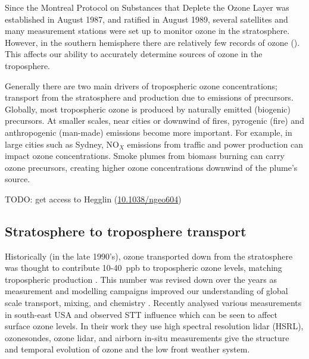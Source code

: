   
  
  Since the Montreal Protocol on Substances that Deplete the Ozone Layer was established in August 1987, and ratified in August 1989, several satellites and many measurement stations were set up to monitor ozone in the stratosphere.
  However, in the southern hemisphere there are relatively few records of ozone (\cite{Huang2017}).
  This affects our ability to accurately determine sources of ozone in the troposphere.
  
  Generally there are two main drivers of tropospheric ozone concentrations; transport from the stratosphere and production due to emissions of precursors. 
  Globally, most tropospheric ozone is produced by naturally emitted (biogenic) precursors.
  At smaller scales, near cities or downwind of fires, pyrogenic (fire) and anthropogenic (man-made) emissions become more important.
  For example, in large cities such as Sydney, NO$_X$ emissions from traffic and power production can impact ozone concentrations.
  Smoke plumes from biomass burning can carry ozone precursors, creating higher ozone concentrations downwind of the plume's source.
  
  
  TODO: get access to Hegglin (\url{10.1038/ngeo604}) \citep{Hegglin2009}
  
  \subsection{Stratosphere to troposphere transport}
    \label{LR:O3:STT}
    Historically (in the late 1990's), ozone transported down from the stratosphere was thought to contribute 10-40~ppb to tropospheric ozone levels, matching tropospheric production \citep{Atkinson2000, Stohl2003}.
    This number was revised down over the years as measurement and modelling campaigns improved our understanding of global scale transport, mixing, and chemistry \citep{Monks2015}.
    Recently \cite{Kuang2017} analysed various measurements in south-east USA and observed STT influence which can be seen to affect surface ozone levels.
    In their work they use high spectral resolution lidar (HSRL), ozonesondes, ozone lidar, and airborn in-situ measurements give the structure and temporal evolution of ozone and the low front weather system.
    
